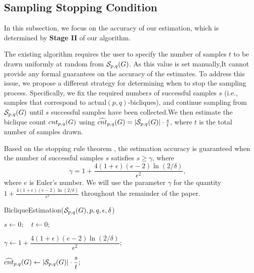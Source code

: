 \subsection{Sampling Stopping Condition}

\label{sec:sampling-stopping-condition}

In this subsection, we focus on the accuracy of our estimation, which is determined by \textbf{Stage II} of our algorithm.


The existing algorithm \cite{zigzag} requires the user to specify the number of samples $t$ to be drawn uniformly at random from $\mathcal{S}_{p,q}(G)$. As this value is set manually,It cannot provide any formal guarantees on the accuracy of the estimates. To address this issue, we propose a different strategy for determining when to stop the sampling process. Specifically, we fix the required number$ s $ of successful samples $s$ (i.e., samples that correspond to actual$ (p,q) $-bicliques), and continue sampling from $ \mathcal{S}_{p,q}(G) $ until $ s $ successful samples have been collected.We then estimate the biclique count ${cnt_{p,q}(G) }$ using ${\widehat{cnt}_{p,q}(G) } = |\mathcal{S}_{p,q}(G)| \cdot \frac{s}{t} $, where $t$ is the total number of samples drawn.

Based on the stopping rule theorem \cite{stoppingrule}, the estimation accuracy is guaranteed when the number of successful samples $s$ satisfies $ s \geq \gamma $, where
\[
\gamma = 1 + \frac{4(1+\epsilon)(e -2)\ln(2/\delta)}{\epsilon^2},
\]
where $ e $ is Euler's number. We will use the parameter $ \gamma $ for the quantity $1 + \frac{4(1+\epsilon)(e -2)\ln(2/\delta)}{\epsilon^2}$ throughout the remainder of the paper.

\begin{algorithm}[]
	\DontPrintSemicolon
	\caption{BicliqueEstimation($ \mathcal{S}_{p,q}(G), p, q, \epsilon, \delta $)}
	\label{alg:sr-biclique-estimator}
	$ s \leftarrow 0; \quad t \leftarrow 0; $

	$ \gamma \leftarrow 1 + \dfrac{4(1+\epsilon)(e -2)\ln(2/\delta)}{\epsilon^2}; $

	\Return$ {\widehat{cnt}_{p,q}(G) } \leftarrow |\mathcal{S}_{p,q}(G)| \cdot \dfrac{s}{t}; $
\end{algorithm}

